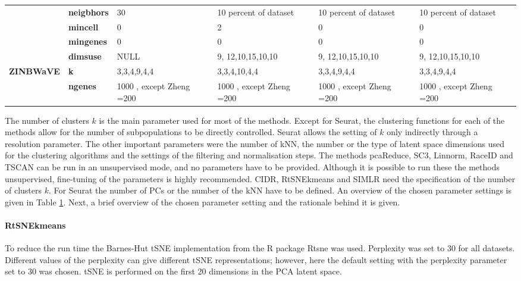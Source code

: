 \documentclass[12pt, a4paper]{article}\usepackage[]{graphicx}\usepackage[]{color}
\begin{document}
\begin{table}[htbp]
{\begin{tabular}{rp{5.585em}llll}
          & \textbf{neigbhors} & 30    & \multicolumn{1}{p{10.165em}}{10 percent of dataset} & \multicolumn{1}{p{9.085em}}{10 percent of dataset} & \multicolumn{1}{p{9.835em}}{10 percent of dataset} \\
          & \textbf{mincell} & 0     & 2     & 0     & 0 \\
          & \textbf{mingenes} & 0     & 0     & 0     & 0 \\
          & \textbf{dimsuse} & NULL  & 9, 12,10,15,10,10 & 9, 12,10,15,10,10 & 9, 12,10,15,10,10 \\
    \midrule
    \multicolumn{1}{l}{\textbf{ZINBWaVE}} & \textbf{k} & \multicolumn{1}{p{13.335em}}{3,3,4,9,4,4} & 3,3,4,10,4,4 & \multicolumn{1}{p{9.085em}}{3,3,4,9,4,4} & \multicolumn{1}{p{9.835em}}{3,3,4,9,4,4} \\
          & \textbf{ngenes} & 1000 , except Zheng =200 & 1000 , except Zheng =200 & 1000 , except Zheng =200 & 1000 , except Zheng =200 \\
    \bottomrule
    \end{tabular}}%
  \label{tab:parameter}%
\end{table}%

The number of clusters $k$ is the main parameter used for most of the methods. Except for Seurat, the clustering functions for each of the methods allow for the number of subpopulations to be directly controlled. Seurat allows the setting of $k$ only indirectly through a resolution parameter. 
The other important parameters were the number of kNN, the number or the type of latent space dimensions used for the clustering algorithms and the settings of the filtering and normalisation steps. The methods pcaReduce, SC3, Linnorm, RaceID and TSCAN can be run in an unsupervised mode, and no parameters have to be provided. Although it is possible to run these the methods unsupervised, fine-tuning of the parameters is highly recommended. CIDR, RtSNEkmeans and SIMLR need the specification of the number of clusters $k$.
For Seurat the number of PCs or the number of the kNN have to be defined. An overview of the chosen parameter settings is given in Table \ref{tab:parameter}.
Next, a brief overview of the chosen parameter setting and the rationale behind it is given.
\paragraph{RtSNEkmeans}
To reduce the run time the Barnes-Hut tSNE implementation from the R package Rtsne was used. Perplexity was set to 30 for all datasets. Different values of the perplexity can give different tSNE representations; however, here the default setting with the perplexity parameter set to 30 was chosen. tSNE is performed on the first 20 dimensions in the PCA latent space. 
\end{document}
